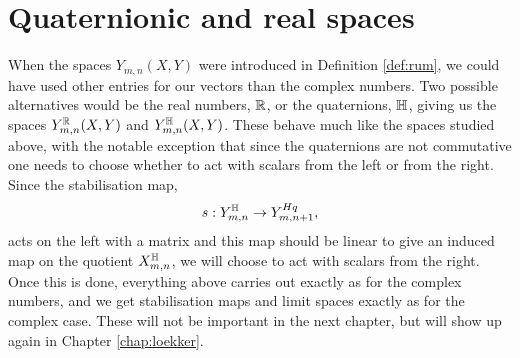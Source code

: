 
\section{Quaternionic and real spaces}
\label{sec:koeff}

When the spaces $Y_{m,n}(X,Y)$ were introduced in Definition
\ref{def:rum}, we could have used other entries for our vectors than
the complex numbers. Two possible alternatives would be the real
numbers, $\mathbb{R}$, or the quaternions, $\mathbb{H}$, giving us the spaces
$Y^{\mathbb{R}}_{m,n}(X,Y)$ and $Y^{\mathbb{H}}_{m,n}(X,Y)$. These behave much like
the spaces studied above, with the notable exception that since the
quaternions are not commutative one needs to choose whether to act
with scalars from the left or from the right. Since the stabilisation
map,
\[ s : Y_{m,n}^{\mathbb{H}} \to Y_{m,n+1}^{Hq}, \]
acts on the left with a matrix and this map should be linear to give
an induced map on the quotient $X^{\mathbb{H}}_{m,n}$, we will choose to act
with scalars from the right. Once this is done, everything above
carries out exactly as for the complex numbers, and we get
stabilisation maps and limit spaces exactly as for the complex
case. These will not be important in the next chapter, but will show
up again in Chapter \ref{chap:loekker}.


